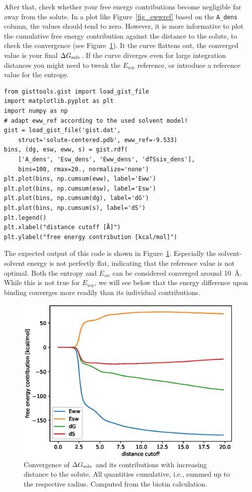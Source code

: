 \documentclass[9pt,tutorial]{livecoms}
\newcommand{\dgsolv}{\Delta G_\textup{solv}}
\newcommand{\software}{\texttt}
\newcommand\inlinecode{\texttt}
\begin{document}
After that, check whether your free energy contributions become negligible far away from the solute.
In a plot like Figure~\ref{fig_ewwref} based on the \inlinecode{A\_dens} column, the values should tend to zero.
However, it is more informative to plot the cumulative free energy contribution against the distance to the solute, to check the convergence (see Figure~\ref{fig_radial_convergence}).
It the curve flattens out, the converged value is your final $\dgsolv$\@.
If the curve diverges even for large integration distances you might need to tweak the $E_{ww}$ reference, or introduce a reference value for the entropy.

\begin{lstlisting}[style=python]
from gisttools.gist import load_gist_file
import matplotlib.pyplot as plt
import numpy as np
# adapt eww_ref according to the used solvent model! 
gist = load_gist_file('gist.dat',
    struct='solute-centered.pdb', eww_ref=-9.533)
bins, (dg, esw, eww, s) = gist.rdf(
    ['A_dens', 'Esw_dens', 'Eww_dens', 'dTSsix_dens'],
    bins=100, rmax=20., normalize='none')
plt.plot(bins, np.cumsum(eww), label='Eww')
plt.plot(bins, np.cumsum(esw), label='Esw')
plt.plot(bins, np.cumsum(dg), label='dG')
plt.plot(bins, np.cumsum(s), label='dS')
plt.legend()
plt.xlabel("distance cutoff [Å]")
plt.ylabel("free energy contribution [kcal/mol]")
\end{lstlisting}

The expected output of this code is shown in Figure~\ref{fig_radial_convergence}.
Especially the solvent-solvent energy is not perfectly flat, indicating that the reference value is not optimal.
Both the entropy and $E_{sw}$ can be considered converged around \SI{10}{\angstrom}.
While this is not true for $E_{ww}$, we will see below that the energy difference upon binding converges more readily than its individual contributions.

\begin{figure}
	\centering
	\includegraphics[width=0.8\linewidth]{figures/A_E_S_convergence.eps}
	\caption{Convergence of $\dgsolv$ and its contributions with increasing distance to the solute. All quantities cumulative, i.e., summed up to the respective radius. Computed from the biotin calculation.}\label{fig_radial_convergence}
\end{figure}
\end{document}
